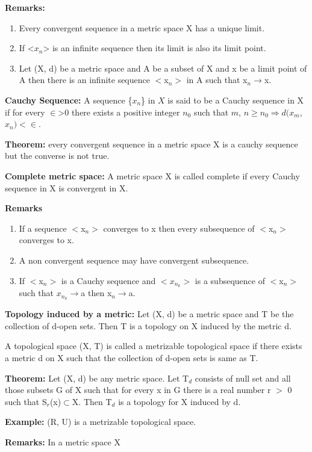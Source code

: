 \documentclass[12pt]{amsart}
\begin{document}
\textbf{Remarks:}

\begin{enumerate}
\item Every convergent sequence in a metric space X has a unique limit.
\item If <$x_{n}$> is an infinite sequence then its limit is also its limit point.
\item Let (X, d) be a metric space and A be a subset of X and x be a limit point of A then there is an infinite sequence $<$x$_{n}>$ in A such that x$_{n}\to $x.
\end{enumerate}
\textbf{Cauchy Sequence:} A sequence {\{}$x_{n}${\}} in $X$ is said to be a 
Cauchy sequence in X if for every $\in $>$0$ there exists a positive integer 
$n_{0}$ such that $m$, $n\geqslant n_{0 }\Rightarrow d(x_{m}$, 
$x_{n})<\in $.

\textbf{Theorem:} every convergent sequence in a metric space X is a cauchy 
sequence but the converse is not true. 

\textbf{Complete metric space:} A metric space X is called complete if every 
Cauchy sequence in X is convergent in X.

\textbf{Remarks}

\begin{enumerate}
\item If a sequence $<$x$_{n}>$ converges to x then every subsequence of $<$x$_{n}>$ converges to x.
\item A non convergent sequence may have convergent subsequence.
\item If $<$x$_{n}>$ is a Cauchy sequence and $<x_{n_k } >$ is a subsequence of $<$x$_{n}>$ such that $x_{n_k } \to $a then x$_{n}\to $a.
\end{enumerate}
\textbf{Topology induced by a metric:} Let (X, d) be a metric space and T be 
the collection of d-open sets. Then T is a topology on X induced by the 
metric d.

A topological space (X, T) is called a metrizable topological space if there 
exists a metric d on X such that the collection of d-open sets is same as T.

\textbf{Theorem:} Let (X, d) be any metric space. Let T$_{d}$ consists of 
null set and all those subsets G of X such that for every x in G there is a 
real number r $>$ 0 such that S$_{r}$(x)$\subset $X. Then T$_{d}$ is a 
topology for X induced by d.

\textbf{Example:} (R, U) is a metrizable topological space.

\textbf{Remarks:} In a metric space X 
\end{document}
